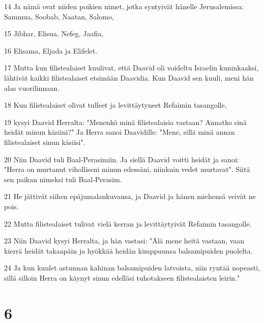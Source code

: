 \par 14 Ja nämä ovat niiden poikien nimet, jotka syntyivät hänelle Jerusalemissa: Sammua, Soobab, Naatan, Salomo,
\par 15 Jibhar, Elisua, Nefeg, Jaafia,
\par 16 Elisama, Eljada ja Elifelet.
\par 17 Mutta kun filistealaiset kuulivat, että Daavid oli voideltu Israelin kuninkaaksi, lähtivät kaikki filistealaiset etsimään Daavidia. Kun Daavid sen kuuli, meni hän alas vuorilinnaan.
\par 18 Kun filistealaiset olivat tulleet ja levittäytyneet Refaimin tasangolle,
\par 19 kysyi Daavid Herralta: "Menenkö minä filistealaisia vastaan? Annatko sinä heidät minun käsiini?" Ja Herra sanoi Daavidille: "Mene, sillä minä annan filistealaiset sinun käsiisi".
\par 20 Niin Daavid tuli Baal-Perasimiin. Ja siellä Daavid voitti heidät ja sanoi: "Herra on murtanut viholliseni minun edessäni, niinkuin vedet murtavat". Siitä sen paikan nimeksi tuli Baal-Perasim.
\par 21 He jättivät siihen epäjumalankuvansa, ja Daavid ja hänen miehensä veivät ne pois.
\par 22 Mutta filistealaiset tulivat vielä kerran ja levittäytyivät Refaimin tasangolle.
\par 23 Niin Daavid kysyi Herralta, ja hän vastasi: "Älä mene heitä vastaan, vaan kierrä heidät takaapäin ja hyökkää heidän kimppuunsa balsamipuiden puolelta.
\par 24 Ja kun kuulet astunnan kahinan balsamipuiden latvoista, niin ryntää nopeasti, sillä silloin Herra on käynyt sinun edelläsi tuhotakseen filistealaisten leirin."

\chapter{6}

